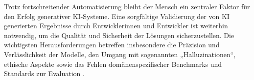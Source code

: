 Trotz fortschreitender Automatisierung bleibt der Mensch ein zentraler Faktor
für den Erfolg generativer KI-Systeme. Eine sorgfältige Validierung der von KI
generierten Ergebnisse durch Entwicklerinnen und Entwickler ist weiterhin
notwendig, um die Qualität und Sicherheit der Lösungen sicherzustellen. Die
wichtigsten Herausforderungen betreffen insbesondere die Präzision und
Verlässlichkeit der Modelle, den Umgang mit sogenannten „Halluzinationen“,
ethische Aspekte sowie das Fehlen domänenspezifischer Benchmarks und Standards
zur Evaluation \cite{esposito_generative_2025}.

